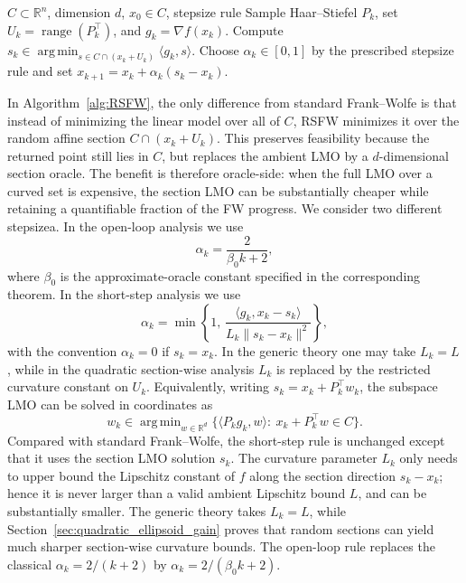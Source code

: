 \documentclass{article}
\DeclareMathOperator*{\argmin}{arg\,min}
\DeclareMathOperator{\range}{range}
\begin{document}
\begin{algorithm}[t]
\caption{Random-Subspace Frank--Wolfe (RSFW)}
\label{alg:RSFW}
\begin{algorithmic}[1]
\Require \(C\subset\mathbb R^n\), dimension \(d\), \(x_0\in C\), stepsize rule
    \State Sample Haar--Stiefel \(P_k\), set \(U_k=\range(P_k^\top)\), and \(g_k=\nabla f(x_k)\).
    \State Compute \(s_k\in\argmin_{s\in C\cap(x_k+U_k)}\langle g_k,s\rangle\).
    \State Choose \(\alpha_k\in[0,1]\) by the prescribed stepsize rule and set \(x_{k+1}=x_k+\alpha_k(s_k-x_k)\).
\EndFor
\end{algorithmic}
\end{algorithm}
In Algorithm~\ref{alg:RSFW}, the only difference from standard Frank--Wolfe is that instead of minimizing
the linear model over all of \(C\), RSFW minimizes it over the random affine
section \(C\cap(x_k+U_k)\). This preserves feasibility because the returned
point still lies in \(C\), but replaces the ambient LMO by a \(d\)-dimensional
section oracle. The benefit is therefore oracle-side: when the full LMO over a
curved set is expensive, the section LMO can be substantially cheaper while
retaining a quantifiable fraction of the FW progress.
We consider two different stepsizea. In the open-loop analysis we use
\begin{equation}
\alpha_k=\frac{2}{\beta_0 k+2},
\label{eq:open_loop_stepsize_alg}
\end{equation}
where $\beta_0$ is the approximate-oracle constant specified in the corresponding theorem.
In the short-step analysis we use
\begin{equation}
\alpha_k
=
\min\!\left\{
1,\,
\frac{\langle g_k,x_k-s_k\rangle}
     {L_k\|s_k-x_k\|^2}
\right\},
\label{eq:short_step_alg}
\end{equation}
with the convention $\alpha_k=0$ if $s_k=x_k$. In the generic theory one may take
$L_k=L$, while in the quadratic section-wise analysis $L_k$ is replaced by the restricted
curvature constant on $U_k$.
Equivalently, writing $s_k=x_k+P_k^\top w_k$, the subspace LMO can be solved in coordinates as
\[
w_k\in\argmin_{w\in\mathbb R^d}
\{\langle P_k g_k,w\rangle:\ x_k+P_k^\top w\in C\}.
\]
Compared with standard Frank--Wolfe, the short-step rule is unchanged except
that it uses the section LMO solution \(s_k\). The curvature parameter \(L_k\)
only needs to upper bound the Lipschitz constant of \(f\) along the section
direction \(s_k-x_k\); hence it is never larger than a valid ambient Lipschitz
bound \(L\), and can be substantially smaller. The generic theory takes
\(L_k=L\), while Section~\ref{sec:quadratic_ellipsoid_gain} proves that random
sections can yield much sharper section-wise curvature bounds. The open-loop
rule replaces the classical \(\alpha_k=2/(k+2)\) by
\(\alpha_k=2/(\beta_0k+2)\).
\end{document}
